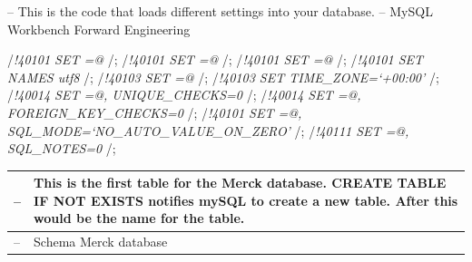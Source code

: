 \documentclass[]{book}
\begin{document}
-- This is the code that loads different settings into your database. --
MySQL Workbench Forward Engineering

/\emph{!40101 SET
\citet{OLD_CHARACTER_SET_CLIENT}=@\citet{CHARACTER_SET_CLIENT} }/;
/\emph{!40101 SET
\citet{OLD_CHARACTER_SET_RESULTS}=@\citet{CHARACTER_SET_RESULTS} }/;
/\emph{!40101 SET
\citet{OLD_COLLATION_CONNECTION}=@\citet{COLLATION_CONNECTION} }/;
/\emph{!40101 SET NAMES utf8 }/; /\emph{!40103 SET
\citet{OLD_TIME_ZONE}=@\citet{TIME_ZONE} }/; /\emph{!40103 SET
TIME\_ZONE=`+00:00' }/; /\emph{!40014 SET
\citet{OLD_UNIQUE_CHECKS}=@\citet{UNIQUE_CHECKS}, UNIQUE\_CHECKS=0 }/;
/\emph{!40014 SET
\citet{OLD_FOREIGN_KEY_CHECKS}=@\citet{FOREIGN_KEY_CHECKS},
FOREIGN\_KEY\_CHECKS=0 }/; /\emph{!40101 SET
\citet{OLD_SQL_MODE}=@\citet{SQL_MODE},
SQL\_MODE=`NO\_AUTO\_VALUE\_ON\_ZERO' }/; /\emph{!40111 SET
\citet{OLD_SQL_NOTES}=@\citet{SQL_NOTES}, SQL\_NOTES=0 }/;

\begin{longtable}[]{@{}ll@{}}
\toprule
-- & This is the first table for the Merck database. CREATE TABLE IF NOT
EXISTS notifies mySQL to create a new table. After this would be the
name for the table.\tabularnewline
\midrule
\endhead
-- & Schema Merck database\tabularnewline
\bottomrule
\end{longtable}
\end{document}
